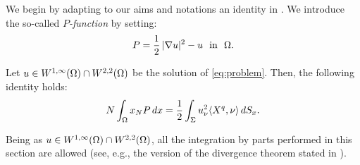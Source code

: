 \documentclass[a4paper,10pt]{amsart}
\numberwithin{equation}{section}
\begin{document}
We begin by adapting to our aims and notations an identity in \cite[Proposition 3.3]{GX}. We introduce the so-called \textit{$P$-function} by setting:
\begin{equation}
\label{P-function}
P= \frac{1}{2}\, |\nabla u|^2 -u \ \mbox{ in } \ \Omega.
\end{equation}

\begin{lem}\label{lem:Pohozaev type}
Let $u\in W^{1,\infty}(\Omega) \cap W^{2,2} (\Omega)$ be the solution of \eqref{eq:problem}. Then, the following identity holds:
\begin{equation}
\label{eq:Pohozaevadhoc}
N \int_\Omega x_N P\, dx = \frac{1}{2} \int_\Sigma u_{\nu}^2 \langle X^q, \nu\rangle \, dS_x.
\end{equation}
\end{lem}
\begin{rem}
	{\rm
		Being as $u \in W^{1,\infty}(\Omega) \cap W^{2,2} (\Omega)$, all the integration by parts performed in this section are allowed (see, e.g., the version of the divergence theorem stated in \cite[Proposition 3.2]{GX}).
	}
\end{rem}
\end{document}
